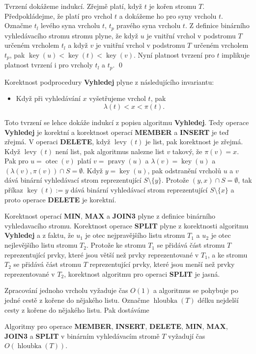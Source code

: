 \documentclass[a4paper,12pt]{article}
\DeclareMathOperator*{\otec}{otec}
\DeclareMathOperator*{\levy}{levy}
\DeclareMathOperator*{\pravy}{pravy}
\DeclareMathOperator*{\key}{key}
\DeclareMathOperator*{\hloubka}{hloubka}
\begin{document}
Tvrzení dokážeme indukcí.  Zřejmě platí, 
když $t$ je kořen stromu $T$.  Předpokládej\-me, že platí pro vrchol 
$t$ a doká\-že\-me ho pro syny vrcholu $t$.  Označme $t_l$ levého syna 
vrcholu $t$, $t_p$ pravého syna vrcholu $t$.  Z definice binárního 
vyhledávacího stromu stromu plyne, že když $u$ je vnitřní 
vrchol v podstromu $T$ určeném vrcholem $t_l$ a když $v$ je vnitřní 
vrchol v podstromu $T$ určeném vrcholem $t_p$, pak 
$\key(u)<\key(t)<\key(v)$.  Nyní platnost tvrzení pro $t$ 
implikuje platnost tvrzení i pro vrcholy $t_l$ a $t_p$.  \qed
\enddemo

Korektnost podprocedury {\bf Vyhledej} plyne z 
následujícího invariantu:
\begin{itemize}
\item
Když při vyhledávání $x$ vyšetřujeme vrchol $
t$, pak 
$$\lambda (t)<x<\pi (t).$$
\end{itemize}
Toto tvrzení se lehce dokáže indukcí z popisu algoritmu 
{\bf Vy\-hledej}.  Tedy operace {\bf Vy\-hledej} je korektní a korekt\-nost 
ope\-rací {\bf MEMBER} a {\bf INSERT} je teď zřejmá. V operaci {\bf DELE\-TE},  
když $\levy(t)$ je list, pak korektnost je zřejmá. Když $\levy
(t)$ 
není list, pak algoritmus nalezne list $v$ takový, že $\pi(v)=x$. 
Pak pro $u=\otec(v)$ platí $v=\pravy(u)$ a $\lambda(v)=\key(u)$ a 
$(\lambda(v),\pi(v))\cap S=\emptyset$. Když $y=\key(u)$, pak 
odstranění vrcholů $u$ a $v$ dává binární vyhledávací strom reprezentující $S\setminus \{y\}$. 
Protože $(y,x)\cap S=\emptyset$, tak příkaz $\key(t):=y$ dává binární 
vyhledávací strom reprezentující $S\setminus \{x\}$ a proto operace 
{\bf DELETE} je korektní. 

Korektnost operací {\bf MIN}, {\bf MAX} a {\bf JOIN3} plyne z definice 
binárního vyhledavacího stromu.  Korektnost operace {\bf SPLIT }
plyne z korektnosti algoritmu {\bf Vyhledej} a z faktu, že $u_
1$ je otec 
nej\-pravějšího listu stromu $T_1$ a $u_2$ je otec nejlevějšího listu stromu $T_2$.  
Protože ke stromu $T_1$ se přidává část stromu $T$ reprezentující 
prvky, které jsou větší než prvky reprezentované v $
T_1$, a ke 
stromu $T_2$ se přidává část stromu $T$ reprezentující prvky, 
které jsou menší než prvky reprezentované v $T_2$, korektnost 
algoritmu pro operaci {\bf SPLIT} je jasná.  

Zpracování jednoho vrcholu vyžaduje čas $O(
1)$ a 
algoritmus se pohybuje po jedné cestě z kořene do 
nějakého listu. Označme $\hloubka(T)$ délku nejdelší cesty 
z kořene do nějakého listu. Pak dostáváme

\begin{veta}Algoritmy pro operace {\bf MEMBER}, {\bf INSERT}, {\bf DE\-LE\-TE}, {\bf MIN}, {\bf MAX}, 
{\bf JOIN3} a {\bf SPLIT} v binár\-ním vy\-hledá\-va\-cím stro\-mě $
T$ vyžadují 
čas $O(\hloubka(T))$. 
\end{veta}
\end{document}
